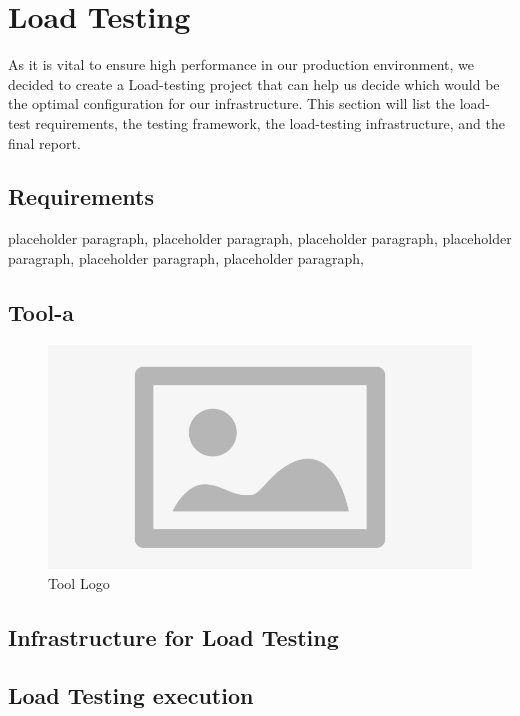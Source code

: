 \section{Load Testing}
\qquad As it is vital to ensure high performance in our production environment, we decided to create a Load-testing project that can help us decide which would be the optimal configuration for our infrastructure. This section will list the load-test requirements, the testing framework, the load-testing infrastructure, and the final report. 

\subsection{Requirements}


placeholder paragraph, placeholder paragraph, placeholder paragraph, placeholder paragraph, placeholder paragraph, placeholder paragraph,

\subsection{Tool-a}

\begin{figure}[!h]
    \centering
    \includegraphics[scale=0.75]{figures/placeholder.png}
    \caption{Tool Logo}
\end{figure}


\subsection{Infrastructure for Load Testing}




\subsection{Load Testing execution}

